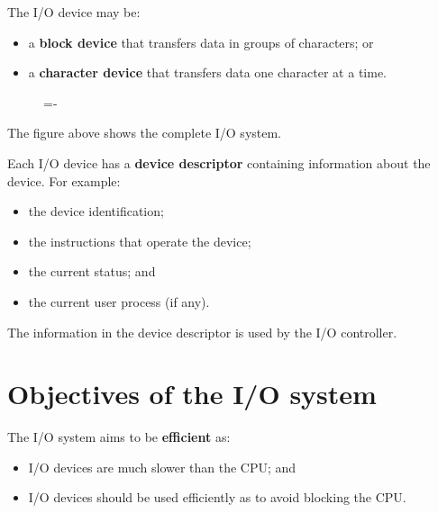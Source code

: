 \documentclass[a4paper]{systems-software}
\begin{document}
The I/O device may be:
\begin{itemize}
	\item a \textbf{block device} that transfers data in groups of characters; or
	\item a \textbf{character device} that transfers data one character at a time.
\end{itemize}

\begin{figure}[H]
  \lineskip=-\fboxrule
\end{figure}

The figure above shows the complete I/O system.

Each I/O device has a \textbf{device descriptor} containing information about the device. For example:
\begin{itemize}
	\item the device identification;
	\item the instructions that operate the device;
	\item the current status; and
	\item the current user process (if any).
\end{itemize}

The information in the device descriptor is used by the I/O controller.


\section*{Objectives of the I/O system}

The I/O system aims to be \textbf{efficient} as:
\begin{itemize}
	\item I/O devices are much slower than the CPU; and
	\item I/O devices should be used efficiently as to avoid blocking the CPU.
\end{itemize}
\end{document}
